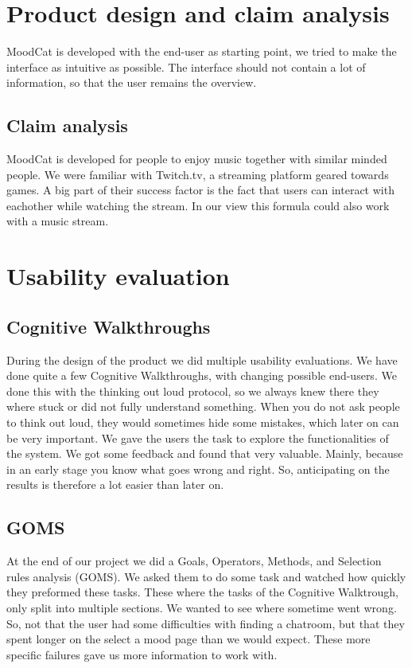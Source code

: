
\section{Product design and claim analysis}
MoodCat is developed with the end-user as starting point, we tried to make the interface as intuitive as possible.
The interface should not contain a lot of information, so that the user remains the overview.

\subsection{Claim analysis}
MoodCat is developed for people to enjoy music together with similar minded people.
We were familiar with Twitch.tv, a streaming platform geared towards games. A big part of their success factor is the fact that users can interact with eachother while watching the stream. In our view this formula could also work with a music stream.

\section{Usability evaluation}
\subsection{Cognitive Walkthroughs}
During the design of the product we did multiple usability evaluations.
We have done quite a few Cognitive Walkthroughs, with changing possible end-users.
We done this with the thinking out loud protocol, so we always knew there they where stuck or did not fully understand something.
When you do not ask people to think out loud, they would sometimes hide some mistakes, which later on can be very important.
We gave the users the task to explore the functionalities of the system.
We got some feedback and found that very valuable.
Mainly, because in an early stage you know what goes wrong and right. 
So, anticipating on the results is therefore a lot easier than later on.
\subsection{GOMS}
At the end of our project we did a Goals, Operators, Methods, and Selection rules analysis (GOMS).
We asked them to do some task and watched how quickly they preformed these tasks.
These where the tasks of the Cognitive Walktrough, only split into multiple sections.
We wanted to see where sometime went wrong. 
So, not that the user had some difficulties with finding a chatroom, but that they spent longer on the select a mood page than we would expect.
These more specific failures gave us more information to work with.

